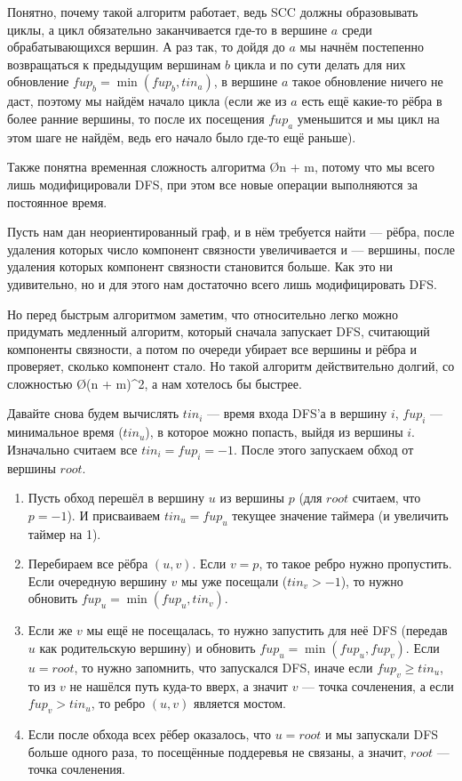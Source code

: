 Понятно, почему такой алгоритм работает, ведь SCC должны образовывать циклы, а цикл обязательно заканчивается где-то в вершине $a$ среди обрабатывающихся вершин. А раз так, то дойдя до $a$ мы начнём постепенно возвращаться к предыдущим вершинам $b$ цикла и по сути делать для них обновление $fup_b = \min(fup_b, tin_a)$, в вершине $a$ такое обновление ничего не даст, поэтому мы найдём начало цикла (если же из $a$ есть ещё какие-то рёбра в более ранние вершины, то после их посещения $fup_a$ уменьшится и мы цикл на этом шаге не найдём, ведь его начало было где-то ещё раньше).

Также понятна временная сложность алгоритма \O{n + m}, потому что мы всего лишь модифицировали DFS, при этом все новые операции выполняются за постоянное время.


Пусть нам дан неориентированный граф, и в нём требуется найти  — рёбра, после удаления которых число компонент связности увеличивается и  — вершины, после удаления которых компонент связности становится больше. Как это ни удивительно, но и для этого нам достаточно всего лишь модифицировать DFS.

Но перед быстрым алгоритмом заметим, что относительно легко можно придумать медленный алгоритм, который сначала запускает DFS, считающий компоненты связности, а потом по очереди убирает все вершины и рёбра и проверяет, сколько компонент стало. Но такой алгоритм действительно долгий, со сложностью \O{(n + m)^2}, а нам хотелось бы быстрее.

Давайте снова будем вычислять $tin_i$ — время входа DFS'а в вершину $i$, $fup_i$ — минимальное время ($tin_u$), в которое можно попасть, выйдя из вершины $i$. Изначально считаем все $tin_i = fup_i = -1$. После этого запускаем обход от вершины $root$.

\begin{box-algo}
    \begin{enumerate}
        \item Пусть обход перешёл в вершину $u$ из вершины $p$ (для $root$ считаем, что $p = -1$). И присваиваем $tin_u = fup_u$ текущее значение таймера (и увеличить таймер на 1).
        \item Перебираем все рёбра $(u, v)$. Если $v = p$, то такое ребро нужно пропустить. Если очередную вершину $v$ мы уже посещали ($tin_v > -1$), то нужно обновить $fup_u = \min(fup_u, tin_v)$.
        \item Если же $v$ мы ещё не посещалась, то нужно запустить для неё DFS (передав $u$ как родительскую вершину) и обновить $fup_u = \min (fup_u, fup_v)$. Если $u = root$, то нужно запомнить, что запускался DFS, иначе если $fup_v \geq tin_u$, то из $v$ не нашёлся путь куда-то вверх, а значит $v$ — точка сочленения, а если $fup_v > tin_u$, то ребро $(u, v)$ является мостом.
        \item Если после обхода всех рёбер оказалось, что $u = root$ и мы запускали DFS больше одного раза, то посещённые поддеревья не связаны, а значит, $root$ — точка сочленения.
    \end{enumerate}
\end{box-algo}

